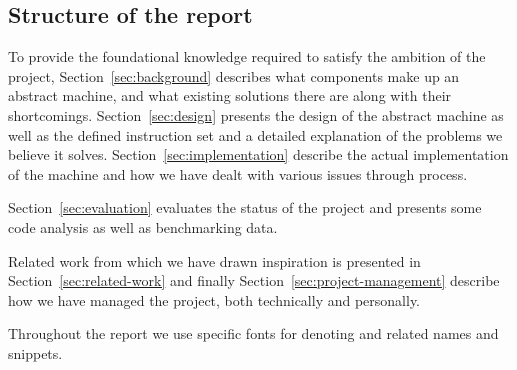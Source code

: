 \subsection{Structure of the report}

To provide the foundational knowledge required to satisfy the ambition of the
project, Section~\ref{sec:background} describes what components make up an
abstract machine, and what existing solutions there are along with their
shortcomings. Section~\ref{sec:design} presents the design of the abstract
machine as well as the defined instruction set and a detailed explanation of the
problems we believe it solves. Section~\ref{sec:implementation} describe the
actual implementation of the machine and how we have dealt with various issues
through process.

Section~\ref{sec:evaluation} evaluates the status of the project and presents
some code analysis as well as benchmarking data.

Related work from which we have drawn inspiration is presented in
Section~\ref{sec:related-work} and finally Section~\ref{sec:project-management}
describe how we have managed the project, both technically and personally.

Throughout the report we use specific fonts for denoting  and
 related names and snippets.
